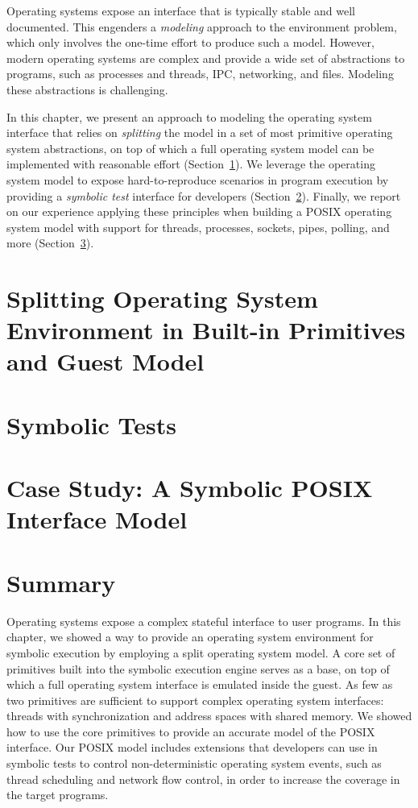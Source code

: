 
Operating systems expose an interface that is typically stable and well documented.
%
This engenders a \emph{modeling} approach to the environment problem, which only involves the one-time effort to produce such a model.
%
However, modern operating systems are complex and provide a wide set of abstractions to programs, such as processes and threads, IPC, networking, and files.  Modeling these abstractions is challenging.

In this chapter, we present an approach to modeling the operating system interface that relies on \emph{splitting} the model in a set of most primitive operating system abstractions, on top of which a full operating system model can be implemented with reasonable effort (Section~\ref{sec:cloud9:splitmodel}).
%
We leverage the operating system model to expose hard-to-reproduce scenarios in program execution by providing a \emph{symbolic test} interface for developers (Section~\ref{sec:cloud9:symtests}).
%
Finally, we report on our experience applying these principles when building a POSIX operating system model with support for threads, processes, sockets, pipes, polling, and more (Section~\ref{sec:cloud9:posix}).


\section{Splitting Operating System Environment in Built-in Primitives and Guest Model}
\label{sec:cloud9:splitmodel}


\section{Symbolic Tests}
\label{sec:cloud9:symtests}


\section{Case Study: A Symbolic POSIX Interface Model}
\label{sec:cloud9:posix}


\section{Summary}

Operating systems expose a complex stateful interface to user programs.
%
In this chapter, we showed a way to provide an operating system environment for symbolic execution by employing a split operating system model.  A core set of primitives built into the symbolic execution engine serves as a base, on top of which a full operating system interface is emulated inside the guest.
%
As few as two primitives are sufficient to support complex operating system interfaces: threads  with synchronization and address spaces with shared memory.
%
We showed how to use the core primitives to provide an accurate model of the POSIX interface.
%
Our POSIX model includes extensions that developers can use in symbolic tests to control non-deterministic operating system events, such as thread scheduling and network flow control, in order to increase the coverage in the target programs.

